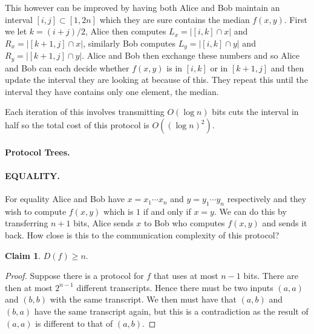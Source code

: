 \documentclass[11pt,a4paper]{article}
\theoremstyle{definition}
\newtheorem{claim}{Claim}
\begin{document}
This however can be improved by having both Alice and Bob maintain an interval $[i,j] \subset [1,2n]$ which they are sure contains the median $f(x,y)$.
First we let $k = (i+j)/2$, Alice then computes $L_x = |[i,k] \cap x|$ and $R_x = |[k+1, j] \cap x|$, similarly Bob computes $L_y = |[i,k] \cap y|$ and $R_y = |[k+1, j] \cap y|$.
Alice and Bob then exchange these numbers and so Alice and Bob can each decide whether $f(x,y)$ is in $[i,k]$ or in $[k+1,j]$ and then update the interval they are looking at because of this.
They repeat this until the interval they have contains only one element, the median.

Each iteration of this involves transmitting $O(\log n)$ bits cuts the interval in half so the total cost of this protocol is $O((\log n)^2)$.

\paragraph{Protocol Trees.}

\paragraph{EQUALITY.}
For equality Alice and Bob have $x = x_1\cdots x_n$ and $y = y_1 \cdots y_n$ respectively and they wish to compute $f(x,y)$ which is $1$ if and only if $x = y$.
We can do this by transferring $n + 1$ bits, Alice sends $x$ to Bob who computes $f(x,y)$ and sends it back.
How close is this to the communication complexity of this protocol?
\begin{claim}
$D(f) \ge n$.
\end{claim}
\begin{proof}
Suppose there is a protocol for $f$ that uses at most $n-1$ bits.
There are then at most $2^{n-1}$ different transcripts.
Hence there must be two inputs $(a,a)$ and $(b,b)$ with the same transcript.
We then must have that $(a,b)$ and $(b,a)$ have the same transcript again, but this is a contradiction as the result of $(a,a)$ is different to that of $(a,b)$.
\end{proof}
\end{document}
